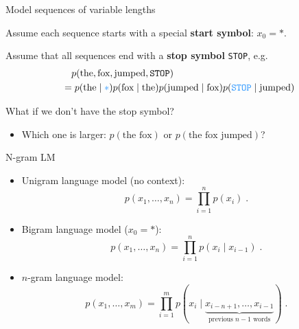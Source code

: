 \documentclass[usenames,dvipsnames,notes,11pt,aspectratio=169,hyperref={colorlinks=true, linkcolor=blue}]{beamer}
\newcommand{\pdfnote}[1]{}
\begin{document}
\begin{frame}
    {Model sequences of variable lengths}

    Assume each sequence starts with a special \textbf{start symbol}: $x_0=*$.
    \medskip

    Assume that all sequences end with a \textbf{stop symbol} \texttt{STOP}, e.g.
    \begin{align*}
        &\quad p(\text{the}, \text{fox}, \text{jumped}, \texttt{STOP})\\
         &= p(\text{the}\mid {\color{blue}*})
         p(\text{fox}\mid \text{the})
         p(\text{jumped}\mid \text{fox})
         p({\color{blue}\texttt{STOP}}\mid \text{jumped})
    \end{align*}

    \pause
    {What if we don't have the stop symbol?}\\
    \begin{itemize}
        \item Which one is larger: $p(\text{the fox})$ or $p(\text{the fox jumped})$?
    \end{itemize}

\end{frame}

\begin{frame}
    {N-gram LM}
    \begin{itemize}
        \item Unigram language model (no context):
            $$
            p(x_1,\ldots, x_n) = \prod_{i=1}^n p(x_i) \;.
            $$
        \item Bigram language model ($x_0=*$):
            $$
            p(x_1,\ldots, x_n) = \prod_{i=1}^n p(x_i\mid x_{i-1}) \;.
            $$
        \item $n$-gram language model:
            $$
            p(x_1,\ldots, x_m) = \prod_{i=1}^m p(x_i\mid \underbrace{
                x_{i-n+1},\ldots, x_{i-1}
            }_{\textstyle\text{previous $n-1$ words}} )
            \;.
            $$
    \end{itemize}
\end{frame}
\end{document}
